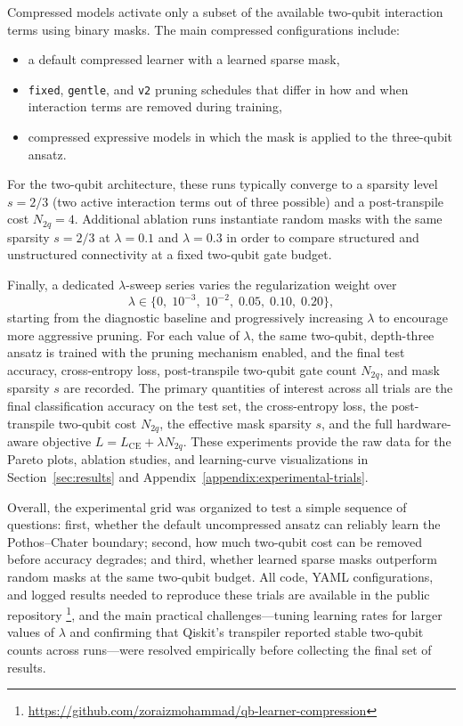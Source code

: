\documentclass[conference]{IEEEtran}
\begin{document}
Compressed models activate only a subset of the available two-qubit interaction terms using binary masks. The main compressed configurations include:
\begin{itemize}
    \item a default compressed learner with a learned sparse mask,
    \item \texttt{fixed}, \texttt{gentle}, and \texttt{v2} pruning schedules that differ in how and when interaction terms are removed during training,
    \item compressed expressive models in which the mask is applied to the three-qubit ansatz.
\end{itemize}
For the two-qubit architecture, these runs typically converge to a sparsity level $s = 2/3$ (two active interaction terms out of three possible) and a post-transpile cost $N_{2q} = 4$. Additional ablation runs instantiate random masks with the same sparsity $s = 2/3$ at $\lambda = 0.1$ and $\lambda = 0.3$ in order to compare structured and unstructured connectivity at a fixed two-qubit gate budget.

Finally, a dedicated $\lambda$-sweep series varies the regularization weight over
\[
\lambda \in \{0,\;10^{-3},\;10^{-2},\;0.05,\;0.10,\;0.20\},
\]
starting from the diagnostic baseline and progressively increasing $\lambda$ to encourage more aggressive pruning. For each value of $\lambda$, the same two-qubit, depth-three ansatz is trained with the pruning mechanism enabled, and the final test accuracy, cross-entropy loss, post-transpile two-qubit gate count $N_{2q}$, and mask sparsity $s$ are recorded. The primary quantities of interest across all trials are the final classification accuracy on the test set, the cross-entropy loss, the post-transpile two-qubit cost $N_{2q}$, the effective mask sparsity $s$, and the full hardware-aware objective $L = L_{\mathrm{CE}} + \lambda N_{2q}$. These experiments provide the raw data for the Pareto plots, ablation studies, and learning-curve visualizations in Section~\ref{sec:results} and Appendix~\ref{appendix:experimental-trials}.

Overall, the experimental grid was organized to test a simple sequence of questions: first, whether the default uncompressed ansatz can reliably learn the Pothos--Chater boundary; second, how much two-qubit cost can be removed before accuracy degrades; and third, whether learned sparse masks outperform random masks at the same two-qubit budget. All code, YAML configurations, and logged results needed to reproduce these trials are available in the public repository \footnote{\url{https://github.com/zoraizmohammad/qb-learner-compression}}, and the main practical challenges—tuning learning rates for larger values of $\lambda$ and confirming that Qiskit’s transpiler reported stable two-qubit counts across runs—were resolved empirically before collecting the final set of results.
\end{document}

